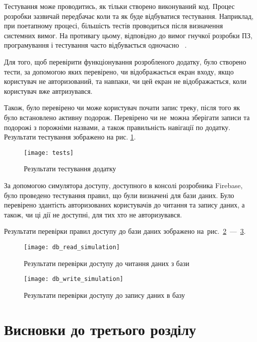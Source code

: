 \documentclass[../main.tex]{subfiles}
\begin{document}
Тестування може проводитись, як тільки створено виконуваний код. Процес розробки зазвичай передбачає коли та як буде відбуватися тестування. Наприклад, при поетапному процесі, більшість тестів проводиться після визначення системних вимог. На противагу цьому, відповідно до вимог гнучкої розробки ПЗ, програмування і тестування часто відбувається одночасно~\cite{testing} .

Для того, щоб перевірити функціонування розробленого додатку, було створено тести, за допомогою яких перевірено, чи відображається екран входу, якщо користувач не авторизований, та навпаки, чи цей екран не відображається, коли користувач вже автризувався. 

Також, було перевірено чи може користувач почати запис треку, після того як було встановлено активну подорож. Перевірено чи не~можна зберігати записи та подорожі з порожніми назвами, а також правильність навігації по додатку. Результати тестування зображено на рис. \ref{figure:test_results}.

\begin{figure}[H]
	\centering
	\texttt{[image: tests]}
	\caption{Результати тестування додатку}
	\label{figure:test_results}
\end{figure}

За допомогою симулятора доступу, доступного в консолі розробника Firebase, було проведено тестування правил, що були визначені для бази даних. Було перевірено здантість авторизованих користувачів до читання та запису даних, а також, чи ці дії не доступні, для тих хто не авторизувався. 

Результати перевірки правил доступу до бази даних зображено на~рис.~\ref{figure:db_read_simulation}~—~\ref{figure:db_write_simulation}.

\begin{figure}[H]
	\centering
	\texttt{[image: db\_read\_simulation]}
	\caption{Результати перевірки доступу до читання даних з бази}
	\label{figure:db_read_simulation}
\end{figure}

\begin{figure}[H]
	\centering
	\texttt{[image: db\_write\_simulation]}
	\caption{Результати перевірки доступу до запису даних в базу}
	\label{figure:db_write_simulation}
\end{figure}

\section{Висновки до третього розділу}
\end{document}
